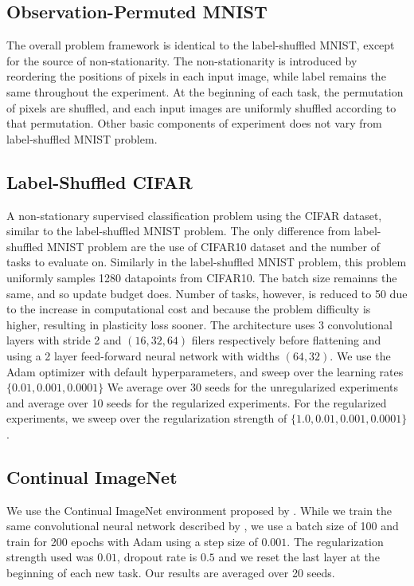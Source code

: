\subsection{Observation-Permuted MNIST}
The overall problem framework is identical to the label-shuffled MNIST, except for the source of non-stationarity.
The non-stationarity is introduced by reordering the positions of pixels in each input image, while label remains the same throughout the experiment.
At the beginning of each task, the permutation of pixels are shuffled, and each input images are uniformly shuffled according to that permutation.
Other basic components of experiment does not vary from label-shuffled MNIST problem.

\subsection{Label-Shuffled CIFAR}
A non-stationary supervised classification problem using the CIFAR dataset, similar to the label-shuffled MNIST problem.
The only difference from label-shuffled MNIST problem are the use of CIFAR10 dataset and the number of tasks to evaluate on.
Similarly in the label-shuffled MNIST problem, this problem uniformly samples 1280 datapoints from CIFAR10.
The batch size remainns the same, and so update budget does.
Number of tasks, however, is reduced to 50 due to the increase in computational cost and because the problem difficulty is higher, resulting in plasticity loss sooner.
The architecture uses 3 convolutional layers with stride 2 and $(16, 32, 64)$ filers respectively before flattening and using a 2 layer feed-forward neural network with widths $(64, 32)$.
We use the Adam optimizer with default hyperparameters, and sweep over the learning rates $\{0.01, 0.001, 0.0001\}$
We average over 30 seeds for the unregularized experiments and average over 10 seeds for the regularized experiments.
For the regularized experiments, we sweep over the regularization strength of $\{1.0, 0.01, 0.001, 0.0001\}$.

\subsection{Continual ImageNet}
We use the Continual ImageNet environment proposed by \cite{dohare23_maint_plast_deep_contin_learn}. While we train the same convolutional neural network described by \cite{dohare23_maint_plast_deep_contin_learn}, we use a batch size of 100 and train for 200 epochs with Adam using a step size of $0.001$. The regularization strength used was $0.01$, dropout rate is $0.5$ and we reset the last layer at the beginning of each new task. Our results are averaged over 20 seeds.

